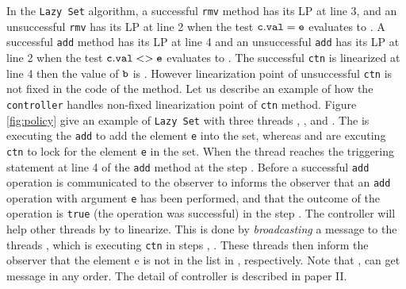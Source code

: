 In the {\tt Lazy Set} algorithm, a successful {\tt rmv} method has its LP at line 3, and an unsuccessful {\tt rmv} has its LP at line 2 when the test $\tt c.val = e$ evaluates to \false. A successful {\tt add} method has its LP at line 4 and an unsuccessful {\tt add} has its LP at line 2 when the test $\tt c.val <> e$ evaluates to \false\;. The successful {\tt ctn} is linearized at line 4 then the value of $\tt b$ is \true. However linearization point of unsuccessful {\tt ctn} is not fixed in the code of the method.  Let us describe an example of how the {\tt controller} handles non-fixed linearization point of {\tt ctn} method. Figure \ref{fig:policy} give an example of {\tt Lazy Set} with three threads \threada\;, \threadb\;, and \threadc. The \threada \; is executing the {\tt add} to add the element {\tt e} into the set, whereas \threadb\; and \threadc\; are excuting {\tt ctn} to lock for the element {\tt e} in the set. When the thread \threada\; reaches the triggering statement at line 4 of the {\tt add} method at the step \;\stepa\;.
Before a successful {\tt add} operation is communicated to the observer 
to informs the observer that an {\tt add} operation 
with argument {\tt e} has been performed, and that the outcome
of the operation is {\tt true} (the operation was successful) in the step \stepf\;. The controller will help other threads
by to linearize. This is done by {\it broadcasting} a message to the threads \threadb, \threadc\; which is executing {\tt ctn} in steps \stepb, \stepc. These threads then inform the observer that the element e is not in the list in \stepc, \stepe\; respectively. Note that \threadb, \threadc\; can get message in any order. The detail of controller is described in paper II.

